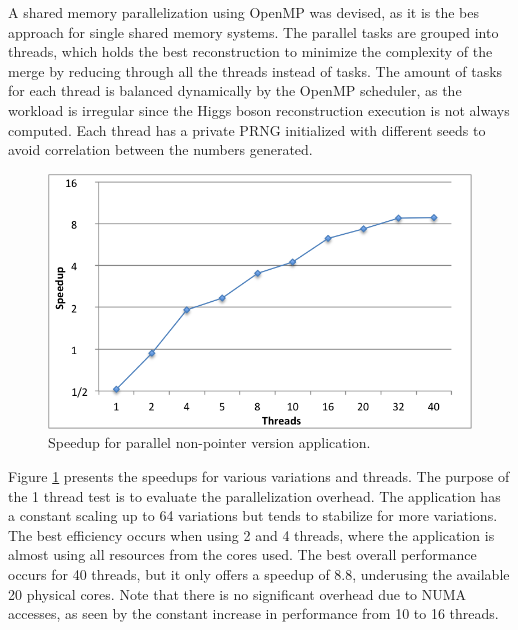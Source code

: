 A shared memory parallelization using OpenMP was devised, as it is the bes approach for single shared memory systems. The parallel tasks are grouped into threads, which holds the best reconstruction to minimize the complexity of the merge by reducing through all the threads instead of tasks. The amount of tasks for each thread is balanced dynamically by the OpenMP scheduler, as the workload is irregular since the Higgs boson reconstruction execution is not always computed. Each thread has a private PRNG initialized with different seeds to avoid correlation between the numbers generated.

\begin{figure}[!htp]
	\begin{center}
		\includegraphics[scale=0.4]{charts/speedup_non_pointer_omp.png}
		\caption{Speedup for \tth parallel non-pointer version application.}
		\label{fig:non_pointer_speedup}
	\end{center}
\end{figure}

Figure \ref{fig:non_pointer_speedup} presents the speedups for various variations and threads. The purpose of the 1 thread test is to evaluate the parallelization overhead. The application has a constant scaling up to 64 variations but tends to stabilize for more variations. The best efficiency occurs when using 2 and 4 threads, where the application is almost using all resources from the cores used. The best overall performance occurs for 40 threads, but it only offers a speedup of 8.8, underusing the available 20 physical cores. Note that there is no significant overhead due to NUMA accesses, as seen by the constant increase in performance from 10 to 16 threads.


